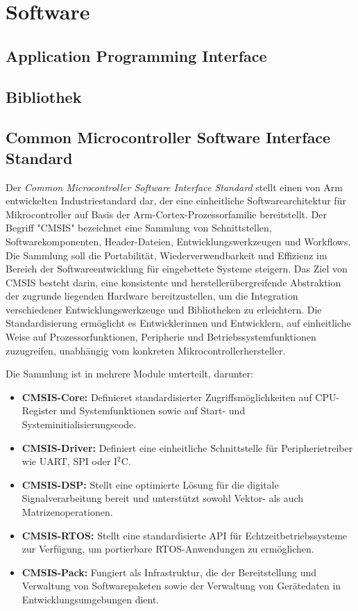 \section{Software}

\subsection{Application Programming Interface}

\subsection{Bibliothek}

\subsection{Common Microcontroller Software Interface Standard}
Der \emph{Common Microcontroller Software Interface Standard} stellt einen von Arm entwickelten Industriestandard dar, der eine einheitliche Softwarearchitektur für Mikrocontroller auf Basis der Arm-Cortex-Prozessorfamilie bereitstellt.
Der Begriff "CMSIS"  bezeichnet eine Sammlung von Schnittstellen, Softwarekomponenten, Header-Dateien, Entwicklungswerkzeugen und Workflows.
 Die Sammlung soll die Portabilität, Wiederverwendbarkeit und Effizienz im Bereich der Softwareentwicklung für eingebettete Systeme steigern.
Das Ziel von CMSIS besteht darin, eine konsistente und herstellerübergreifende Abstraktion der zugrunde liegenden Hardware bereitzustellen, um die Integration verschiedener Entwicklungswerkzeuge und Bibliotheken zu erleichtern.
Die Standardisierung ermöglicht es Entwicklerinnen und Entwicklern, auf einheitliche Weise auf Prozessorfunktionen, Peripherie und Betriebssystemfunktionen zuzugreifen, unabhängig vom konkreten Mikrocontrollerhersteller.

Die Sammlung ist in mehrere Module unterteilt, darunter:
\begin{itemize}
	\item \textbf{CMSIS-Core:} Definieret standardisierter Zugriffsmöglichkeiten auf CPU-Register und Systemfunktionen sowie auf Start- und Systeminitialisierungscode.
	\item \textbf{CMSIS-Driver:} Definiert eine einheitliche Schnittstelle für Peripherietreiber wie UART, SPI oder I$^2$C.
	\item \textbf{CMSIS-DSP:} Stellt eine optimierte Lösung für die digitale Signalverarbeitung bereit und unterstützt sowohl Vektor- als auch Matrizenoperationen.
	\item \textbf{CMSIS-RTOS:} Stellt eine standardisierte API für Echtzeitbetriebssysteme zur Verfügung, um portierbare RTOS-Anwendungen zu ermöglichen.
	\item \textbf{CMSIS-Pack:} Fungiert als Infrastruktur, die der Bereitstellung und Verwaltung von Softwarepaketen sowie der Verwaltung von Gerätedaten in Entwicklungsumgebungen dient.
\end{itemize}

